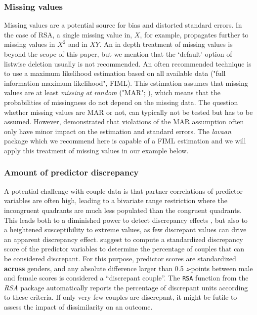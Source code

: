 \documentclass[jou,a4paper,draftfirst]{apa6}
\newcommand{\added}[1]{\textcolor{colour_added}{\bf{#1}}}
\begin{document}
\subsubsection{Missing values}
Missing values are a potential source for bias and distorted standard errors. In the case of RSA, a single missing value in, $X$, for example, propagates further to missing values in $X^2$ and in $XY$. An in depth treatment of missing values is beyond the scope of this paper, but we mention that the `default' option of listwise deletion usually is not recommended. An often recommended technique is to use a maximum likelihood estimation based on all available data ("full information maximum likelihood", FIML). This estimation assumes that missing values are at least \emph{missing at random} ("MAR"; ), which means that the probabilities of missingness do not depend on the missing data. The question whether missing values are MAR or not, can typically not be tested but has to be assumed. However, \textcite{collins_comparison_2001} demonstrated that violations of the MAR assumption often only have minor impact on the estimation and standard errors. The \emph{lavaan} package which we recommend here is capable of a FIML estimation and we will apply this treatment of missing values in our example below.


\subsubsection{Amount of predictor discrepancy}
A potential challenge with couple data is that partner correlations of predictor variables are often high, leading to a bivariate range restriction where the incongruent quadrants are much less populated than the congruent quadrants. This leads both to a diminished power to detect discrepancy effects \parencite{McClelland_Judd_1993}, but also to a heightened susceptibility to extreme values, as few discrepant values can drive an apparent discrepancy effect. \textcite{shanock_polynomial_2010} suggest to compute a standardized discrepancy score of the predictor variables to determine the percentage of couples that can be considered discrepant. For this purpose, predictor scores are standardized \added{across} genders, and any absolute difference larger than 0.5 \textit{z}-points between male and female scores is considered a ``discrepant couple''. The {\tt RSA} function from the \textit{RSA} package automatically reports the percentage of discrepant units according to these criteria. If only very few couples are discrepant, it might be futile to assess the impact of dissimilarity on an outcome. 
\end{document}
